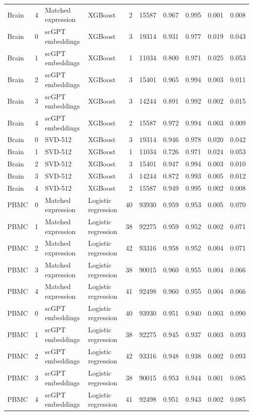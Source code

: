 {\begin{longtable}{lrllrrrrrr}
Brain & 4 & Matched expression & XGBoost & 2 & 15587 & 0.967 & 0.995 & 0.001 & 0.008 \\
Brain & 0 & scGPT embeddings & XGBoost & 3 & 19314 & 0.931 & 0.977 & 0.019 & 0.043 \\
Brain & 1 & scGPT embeddings & XGBoost & 1 & 11034 & 0.800 & 0.971 & 0.025 & 0.053 \\
Brain & 2 & scGPT embeddings & XGBoost & 3 & 15401 & 0.965 & 0.994 & 0.003 & 0.011 \\
Brain & 3 & scGPT embeddings & XGBoost & 3 & 14244 & 0.891 & 0.992 & 0.002 & 0.015 \\
Brain & 4 & scGPT embeddings & XGBoost & 2 & 15587 & 0.972 & 0.994 & 0.003 & 0.009 \\
Brain & 0 & SVD-512 & XGBoost & 3 & 19314 & 0.946 & 0.978 & 0.020 & 0.042 \\
Brain & 1 & SVD-512 & XGBoost & 1 & 11034 & 0.726 & 0.971 & 0.024 & 0.053 \\
Brain & 2 & SVD-512 & XGBoost & 3 & 15401 & 0.947 & 0.994 & 0.003 & 0.010 \\
Brain & 3 & SVD-512 & XGBoost & 3 & 14244 & 0.872 & 0.993 & 0.005 & 0.012 \\
Brain & 4 & SVD-512 & XGBoost & 2 & 15587 & 0.949 & 0.995 & 0.002 & 0.008 \\
PBMC & 0 & Matched expression & Logistic regression & 40 & 93930 & 0.959 & 0.953 & 0.005 & 0.070 \\
PBMC & 1 & Matched expression & Logistic regression & 38 & 92275 & 0.959 & 0.952 & 0.002 & 0.071 \\
PBMC & 2 & Matched expression & Logistic regression & 42 & 93316 & 0.958 & 0.952 & 0.004 & 0.071 \\
PBMC & 3 & Matched expression & Logistic regression & 38 & 90015 & 0.960 & 0.955 & 0.004 & 0.066 \\
PBMC & 4 & Matched expression & Logistic regression & 41 & 92498 & 0.960 & 0.955 & 0.004 & 0.066 \\
PBMC & 0 & scGPT embeddings & Logistic regression & 40 & 93930 & 0.951 & 0.940 & 0.003 & 0.090 \\
PBMC & 1 & scGPT embeddings & Logistic regression & 38 & 92275 & 0.945 & 0.937 & 0.003 & 0.093 \\
PBMC & 2 & scGPT embeddings & Logistic regression & 42 & 93316 & 0.948 & 0.938 & 0.002 & 0.093 \\
PBMC & 3 & scGPT embeddings & Logistic regression & 38 & 90015 & 0.953 & 0.944 & 0.001 & 0.085 \\
PBMC & 4 & scGPT embeddings & Logistic regression & 41 & 92498 & 0.951 & 0.943 & 0.002 & 0.085 \\

\end{longtable}}
